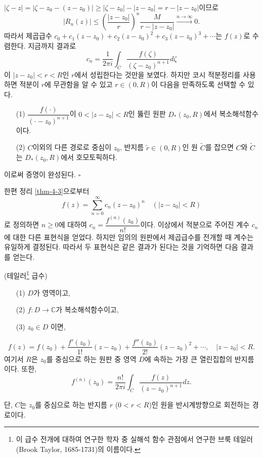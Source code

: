 $|\zeta-z| = |\zeta-z_0-(z-z_0)| \ge
|\zeta-z_0| - |z-z_0| = r - |z-z_0|$이므로
\[
|R_n(z)| \le \left( \dfrac{|z-z_0|}r \right)^n \dfrac M{r-|z-z_0|} 
\stackrel{n\to\infty}{\longrightarrow} 0.
\]
따라서 제곱급수 $c_0 + c_1(z-z_0) + c_2(z-z_0)^2 + c_3(z-z_0)^3+ \cdots$는
$f(z)$로 수렴한다.
지금까지 결과로
\[
c_n = \dfrac1{2\pi i} \int_C \dfrac{f(\zeta)}{(\zeta-z_0)^{n+1}} d\zeta
\]
이 $|z-z_0|<r<R$인 $r$에서 성립한다는 것만을 보였다.
하지만 코시 적분정리를 사용하면 적분이 $r$에 무관함을 알 수 있고
$r\in (0,R)$이 다음을 만족하도록 선택할 수 있다.
\begin{itemize}
\item[(1)] $\dfrac{f(\cdot)}{(\cdot - z_0)^{n+1}}$이 
$0<|z-z_0|<R$인 뚫린 원판 $D_*(z_0,R)$에서 복소해석함수이다.
\item[(2)] $C$이외의 다른 경로로 중심이 $z_0$, 반지름 $\tilde r\in (0,R)$인 원 $\tilde C$를 잡으면
$C$와 $\tilde C$는 $D_*(z_0,R)$에서 호모토픽하다. 
\end{itemize}
이로써 증명이 완성된다. \hfill $\square$

한편 정리 \ref{thm-4-3}으로부터
\[
f(z) = \sum_{n=0}^\infty c_n(z-z_0)^n
\quad (|z-z_0| <R)
\]
로 정의하면 $n\ge0$에 대하여 $c_n = \dfrac{f^{(n)}(z_0)}{n!}$이다.
이상에서 적분으로 주어진 계수 $c_n$에 대한  다른 표현식을 얻었다.
하지만 임의의 원판에서 제곱급수를 전개할 때 계수는 유일하게 결정된다.
따라서 두 표현식은 같은 결과가 된다는 것을 기억하면 다음 결과를 얻는다.

\begin{salt_corollary}(테일러\footnote{
이 급수 전개에 대하여 연구한 학자 중 실해석 함수 관점에서 연구한
브룩 테일러(Brook Taylor, 1685-1731)의 이름이다.
}
 급수) \label{coro-4-4}
\begin{itemize}
\item[(1)] $D$가 영역이고,
\item[(2)] $f:D\to \mathbb C$가 복소해석함수이고,
\item[(3)] $z_0\in D$ 이면,
\end{itemize}
\[
f(z) = f(z_0) + \dfrac{f'(z_0)}{1!}(z-z_0) + \dfrac{f''(z_0)}{2!}(z-z_0)^ 2 
+ \cdots, \quad |z-z_0|<R.
\]
여기서 $R$은 $z_0$를 중심으로 하는 원판 중 영역 $D$에 속하는 가장 큰 열린집합의
반지름이다. 또한,
\begin{equation} \label{eq-4-2}
f^{(n)}(z_0) = \dfrac{n!}{2\pi i}\int_C \dfrac{f(z)}{(z-z_0)^{n+1}}dz.
\end{equation}
\end{salt_corollary}
단, $C$는 $z_0$를 중심으로 하는 반지름 $r$ ($0<r<R$)인 원을 반시계방향으로 회전하는 경로이다.


